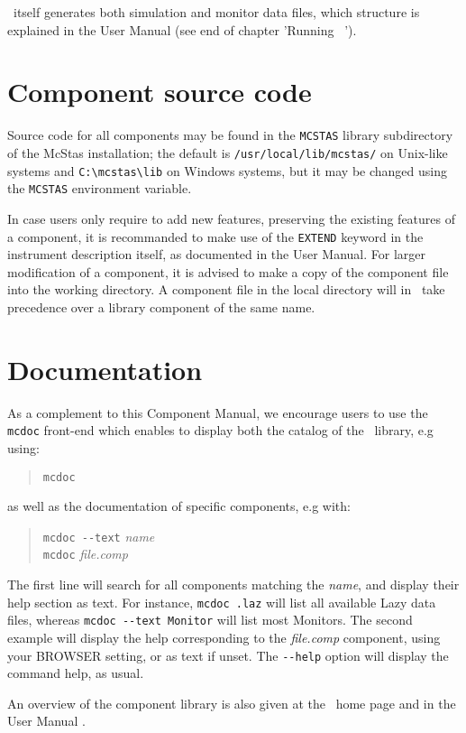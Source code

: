 \MCS\ itself generates both simulation and monitor data files, which structure is explained in the User Manual (see end of chapter 'Running \MCS\ ').

\section{Component source code}
Source code for all components may be found in the \verb+MCSTAS+ library
subdirectory of the McStas installation;
the default is \verb+/usr/local/lib/mcstas/+
on Unix-like systems and \verb+C:\mcstas\lib+ on Windows systems, but it may be
changed using the \verb+MCSTAS+ environment variable.

In case users only require to add new features, preserving the existing features of a component, it is recommanded to make use of the \verb+EXTEND+ keyword in the instrument description itself, as documented in the User Manual. For larger modification of a component, it is advised to make a copy
of the component file into the working directory.
A component file in the local directory will in \MCS\ take precedence over
a library component of the same name.

\section{Documentation}
As a complement to this Component Manual, we encourage users to use
the \verb+mcdoc+ front-end which enables to display both the
catalog of the \MCS\ library, e.g using: 
\begin{quote}
  \verb|mcdoc|
\end{quote}
as well as the documentation of specific components, e.g with:
\begin{quote}
  \verb|mcdoc --text| {\it name} \\
  \verb|mcdoc| {\it file.comp}
\end{quote}
The first line will search for all components matching the {\it name},
and display their help section as text. For instance, \verb+mcdoc .laz+ will list all available Lazy data files, whereas \verb+mcdoc --text Monitor+ will list most Monitors.
The second example will display the help corresponding to
the {\it file.comp} component, using your
BROWSER setting, or as text if unset.
The \verb+--help+ option will display the command help, as usual.

An overview of the component library is also given at the \MCS\ home page \cite{mcstas_webpage} and in the User Manual \cite{mcstasmanual}.

